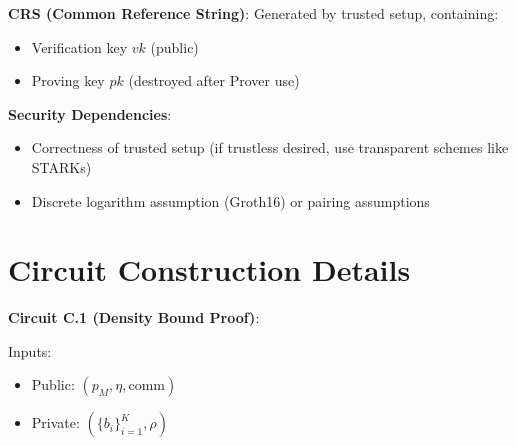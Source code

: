 \documentclass[12pt]{article}
\theoremstyle{plain}
\theoremstyle{definition}
\begin{document}
\textbf{CRS (Common Reference String)}: Generated by trusted setup, containing:
\begin{itemize}
\item Verification key $vk$ (public)
\item Proving key $pk$ (destroyed after Prover use)
\end{itemize}

\textbf{Security Dependencies}:
\begin{itemize}
\item Correctness of trusted setup (if trustless desired, use transparent schemes like STARKs)
\item Discrete logarithm assumption (Groth16) or pairing assumptions
\end{itemize}

\section{Circuit Construction Details}

\textbf{Circuit C.1 (Density Bound Proof)}:

Inputs:
\begin{itemize}
\item Public: $(p_M, \eta, \text{comm})$
\item Private: $(\{b_i\}_{i=1}^K, \rho)$
\end{itemize}
\end{document}
